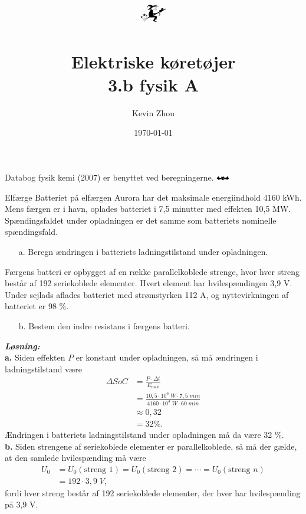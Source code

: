 \documentclass{report}
\title{
\[
\mathwitch*
\]\\
Elektriske køretøjer\\
{\Large \textbf{3.b fysik A}}}
\author{Kevin Zhou}
\date{\today}
\newcommand{\sol}{\setlength{\parindent}{0cm}\textbf{\textit{Løsning:}}\setlength{\parindent}{1cm}}
\begin{document}
\maketitle
\begin{note}
  Databog fysik kemi (2007) er benyttet ved beregningerne. $\mathbat$
\end{note}
\begin{question}{Elfærge}{}
  Batteriet på elfærgen Aurora har det maksimale energiindhold 4160 kWh.
Mens færgen er i havn, oplades batteriet i 7,5 minutter med effekten 10,5
MW.
Spændingsfaldet under opladningen er det samme som batteriets nominelle
spændingsfald.
\begin{itemize}
  \item[a.] Beregn ændringen i batteriets ladningstilstand under opladningen.
\end{itemize}
Færgens batteri er opbygget af en række parallelkoblede strenge, hvor hver
streng består af 192 seriekoblede elementer. Hvert element har
hvilespændingen 3,9 V.
Under sejlads aflades batteriet med strømstyrken 112 A, og nyttevirkningen
af batteriet er 98 \%.
\begin{itemize}
  \item[b.] Bestem den indre resistans i færgens batteri.
\end{itemize}
\end{question}
\sol \\
\textbf{a.}
Siden effekten $P$ er konstant under opladningen, så må ændringen i ladningstilstand være 
\begin{equation*}
\begin{split}
  \Delta SoC&=\frac{P \cdot \Delta t}{E _{\text{max} }}\\
  &=\frac{10,5 \cdot 10^6 \;\unit{W} \cdot 7,5 \;\unit{min} }{4160 \cdot 10^3 \;\unit{W} \cdot 60 \;\unit{min} }\\
  &\approx 0,32\\
  &=32 \%.
\end{split}
\end{equation*}
Ændringen i batteriets ladningstilstand under opladningen må da være 32 \%.\\[1ex]
\textbf{b.}
Siden strengene af seriekoblede elementer er parallelkoblede, så må der gælde, at den samlede hvilespænding må være
\begin{equation*}
\begin{split}
  U_0&=U_0(\text{streng 1}) = U_0(\text{streng 2}) = \cdots =U_0(\text{streng } n)\\
  &=192 \cdot 3,9 \;\unit{V},
\end{split}
\end{equation*}
fordi hver streng består af 192 seriekoblede elementer, der hver har hvilespænding på 3,9 V.
\end{document}
